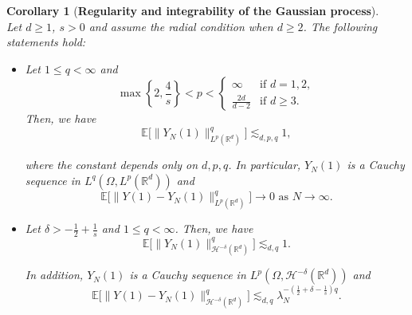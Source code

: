 \documentclass[%
11pt,  reqno]{amsart}
\newtheorem{corollary}[theorem]{Corollary}
\theoremstyle{remarkstyle}
\newcommand{\1}{\hspace{0.2mm}\text{I}\hspace{0.2mm}}
\newcommand{\noi}{\noindent}
\newcommand{\R}{\mathbb{R}}
\newcommand{\E}{\mathbb{E}}
\renewcommand{\L}{\mathcal{L}}
\newcommand{\dl}{\delta}
\newcommand{\ld}{\lambda}
\newcommand{\les}{\lesssim}
\numberwithin{equation}{section}
\numberwithin{theorem}{section}
\begin{document}
	\begin{corollary} [\bf Regularity and integrability of the Gaussian process]
		\label{COR:intp} \mbox{} \\
		Let $d\geq 1$, $s>0$ and assume the radial condition when $d\ge 2$. The following statements hold:
		\begin{itemize}
			\item
			[\textup{(i)}] Let $1\le q <\infty$ and 
			$$
			\max\left\{2,\frac4s\right\} < p < 
			\begin{cases}
				\infty &\text{if } d=1,2, \\
				\frac{2d}{d-2} &\text{if } d\ge 3.
			\end{cases}
			$$
			Then, we have
			\[
			\E \big[\| Y_N (1) \|_{L^p(\R^d)}^q \big] \les_{d,p,q}  1 ,
			\]
			
			\noi
			where the constant depends only on $d, p,q$. In particular, $Y_N(1)$ is a Cauchy sequence in $L^q(\Omega, L^p(\R^d))$ and
			$$
			\E \big[\|Y(1)-Y_N(1)\|^q_{L^p(\R^d)} \big] \to 0 \text{ as } N \to \infty.
			$$
			
			\item
			[\textup{(ii)}] Let $\dl > -\frac12 + \frac1s$ and $1 \le q < \infty$.
			Then, we have 
			\[
			\E \big[\| Y_N (1) \|_{\mathcal H^{-\dl}(\R^d)}^q \big] \les_{d,q}  1.
			\]
			
			\noi
			In addition, $Y_N(1)$ is a Cauchy sequence in $L^p(\Omega, \mathcal H^{-\dl}(\R^d))$ and
			$$
			\E \big[\|Y(1)-Y_N(1)\|^q_{\mathcal H^{-\dl}(\R^d)} \big] \les_{d,q} \ld_N^{-\left(\frac12 +\dl -\frac1s \right) q}.
			$$
			
		\end{itemize}
	\end{corollary}
	
\end{document}
